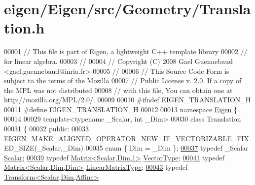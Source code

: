 \hypertarget{eigen_2_eigen_2src_2_geometry_2_translation_8h_source}{}\section{eigen/\+Eigen/src/\+Geometry/\+Translation.h}
\label{eigen_2_eigen_2src_2_geometry_2_translation_8h_source}

\begin{DoxyCode}
00001 \textcolor{comment}{// This file is part of Eigen, a lightweight C++ template library}
00002 \textcolor{comment}{// for linear algebra.}
00003 \textcolor{comment}{//}
00004 \textcolor{comment}{// Copyright (C) 2008 Gael Guennebaud <gael.guennebaud@inria.fr>}
00005 \textcolor{comment}{//}
00006 \textcolor{comment}{// This Source Code Form is subject to the terms of the Mozilla}
00007 \textcolor{comment}{// Public License v. 2.0. If a copy of the MPL was not distributed}
00008 \textcolor{comment}{// with this file, You can obtain one at http://mozilla.org/MPL/2.0/.}
00009 
00010 \textcolor{preprocessor}{#ifndef EIGEN\_TRANSLATION\_H}
00011 \textcolor{preprocessor}{#define EIGEN\_TRANSLATION\_H}
00012 
00013 \textcolor{keyword}{namespace }\hyperlink{namespace_eigen}{Eigen} \{ 
00014 
00029 \textcolor{keyword}{template}<\textcolor{keyword}{typename} \_Scalar, \textcolor{keywordtype}{int} \_Dim>
00030 \textcolor{keyword}{class }Translation
00031 \{
00032 \textcolor{keyword}{public}:
00033   EIGEN\_MAKE\_ALIGNED\_OPERATOR\_NEW\_IF\_VECTORIZABLE\_FIXED\_SIZE(\_Scalar,\_Dim)
00035   \textcolor{keyword}{enum} \{ Dim = \_Dim \};
\hyperlink{group___geometry___module_ad596bf21ced4b902cc242205df486e21}{00037}   \textcolor{keyword}{typedef} \_Scalar \hyperlink{group___geometry___module_ad596bf21ced4b902cc242205df486e21}{Scalar};
\hyperlink{group___geometry___module_a339e17dfec5394ae563f62cca0df451f}{00039}   \textcolor{keyword}{typedef} \hyperlink{group___core___module}{Matrix<Scalar,Dim,1>} \hyperlink{group___geometry___module_a339e17dfec5394ae563f62cca0df451f}{VectorType};
\hyperlink{group___geometry___module_ac5aca3bc67564e96ad550aba971de8b6}{00041}   \textcolor{keyword}{typedef} \hyperlink{group___core___module_class_eigen_1_1_matrix}{Matrix<Scalar,Dim,Dim>} \hyperlink{group___geometry___module_ac5aca3bc67564e96ad550aba971de8b6}{LinearMatrixType};
\hyperlink{group___geometry___module_a25c762409320ba9490a0d12c6652bbad}{00043}   \textcolor{keyword}{typedef} \hyperlink{group___geometry___module_class_eigen_1_1_transform}{Transform<Scalar,Dim,Affine>} 

\end{DoxyCode}

